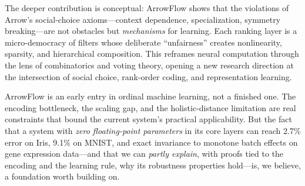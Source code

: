 \documentclass[12pt]{article}
\begin{document}
The deeper contribution is conceptual: ArrowFlow shows that the violations of Arrow's social-choice axioms---context dependence, specialization, symmetry breaking---are not obstacles but \emph{mechanisms} for learning. Each ranking layer is a micro-democracy of filters whose deliberate ``unfairness'' creates nonlinearity, sparsity, and hierarchical composition. This reframes neural computation through the lens of combinatorics and voting theory, opening a new research direction at the intersection of social choice, rank-order coding, and representation learning.

ArrowFlow is an early entry in ordinal machine learning, not a finished one. The encoding bottleneck, the scaling gap, and the holistic-distance limitation are real constraints that bound the current system's practical applicability. But the fact that a system with \emph{zero floating-point parameters} in its core layers can reach 2.7\% error on Iris, 9.1\% on MNIST, and exact invariance to monotone batch effects on gene expression data---and that we can \emph{partly explain}, with proofs tied to the encoding and the learning rule, why its robustness properties hold---is, we believe, a foundation worth building on.




\end{document}
